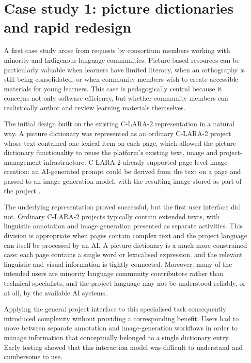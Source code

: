 \documentclass[11pt,a4paper]{article}
\begin{document}
\section{Case study 1: picture dictionaries and rapid redesign}

A first case study arose from requests by consortium members working with minority and Indigenous language communities. Picture-based resources can be particularly valuable when learners have limited literacy, when an orthography is still being consolidated, or when community members wish to create accessible materials for young learners. This case is pedagogically central because it concerns not only software efficiency, but whether community members can realistically author and review learning materials themselves.

The initial design built on the existing C-LARA-2 representation in a natural way. A picture dictionary was represented as an ordinary C-LARA-2 project whose text contained one lexical item on each page, which allowed the picture-dictionary functionality to reuse the platform's existing text, image and project-management infrastructure. C-LARA-2 already supported page-level image creation: an AI-generated prompt could be derived from the text on a page and passed to an image-generation model, with the resulting image stored as part of the project \citep{RendinaEtAl2025}.

The underlying representation proved successful, but the first user interface did not. Ordinary C-LARA-2 projects typically contain extended texts, with linguistic annotation and image generation presented as separate activities. This division is appropriate when pages contain complex text and the project language can itself be processed by an AI. A picture dictionary is a much more constrained case: each page contains a single word or lexicalised expression, and the relevant linguistic and visual information is tightly connected. Moreover, many of the intended users are minority language community contributors rather than technical specialists, and the project language may not be understood reliably, or at all, by the available AI systems.

Applying the general project interface to this specialised task consequently introduced complexity without providing a corresponding benefit. Users had to move between separate annotation and image-generation workflows in order to manage information that conceptually belonged to a single dictionary entry. Early testing showed that this interaction model was difficult to understand and cumbersome to use.
\end{document}
